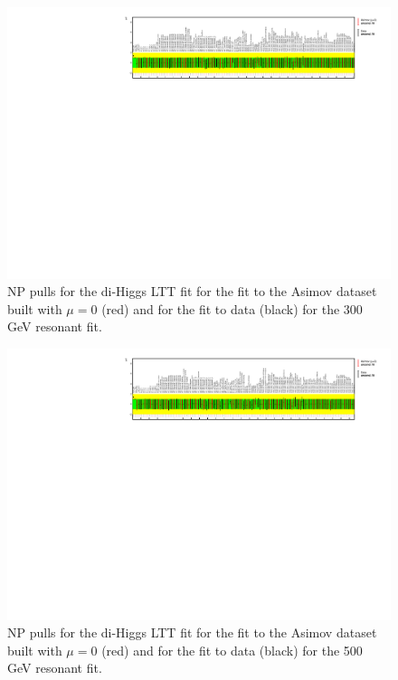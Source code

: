 \begin{figure}
\centering
\includegraphics[angle=270]{figures/results/HH/LepHad/NP_allExceptGammas_2HDM300_LTT.pdf}
\caption{NP pulls for the di-Higgs \lephad LTT fit for the fit to the Asimov dataset built with $\mu=0$ (red) and for the fit to data (black) for the 300 GeV resonant fit.}
\label{fig:LepHadPostfitNPPulls2HDM300LTT}
\end{figure}

\begin{figure}
\centering
\includegraphics[angle=270]{figures/results/HH/LepHad/NP_allExceptGammas_2HDM500_LTT.pdf}
\caption{NP pulls for the di-Higgs \lephad LTT fit for the fit to the Asimov dataset built with $\mu=0$ (red) and for the fit to data (black) for the 500 GeV resonant fit.}
\label{fig:LepHadPostfitNPPulls2HDM500LTT}
\end{figure}

